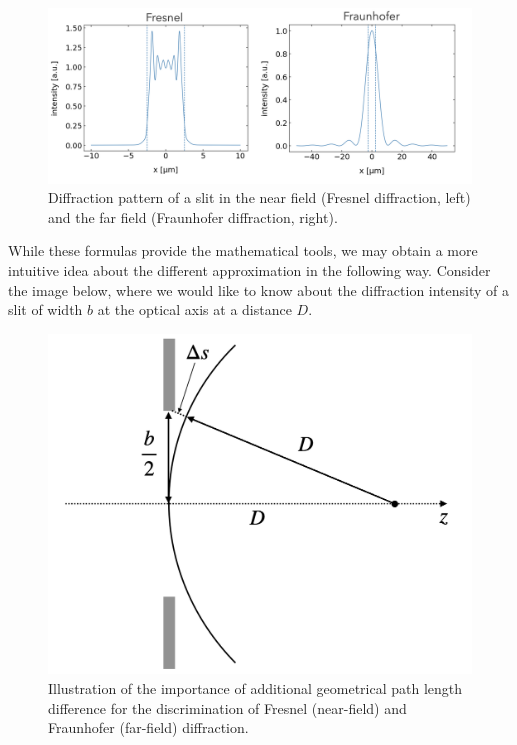 \documentclass[
  a4paper,
]{book}
\begin{document}
\begin{figure}[H]

{\centering \includegraphics[width=0.9\linewidth,height=\textheight,keepaspectratio]{wave-optics/img/near_far_field.png}

}

\caption{Diffraction pattern of a slit in the near field (Fresnel
diffraction, left) and the far field (Fraunhofer diffraction, right).}

\end{figure}%

While these formulas provide the mathematical tools, we may obtain a
more intuitive idea about the different approximation in the following
way. Consider the image below, where we would like to know about the
diffraction intensity of a slit of width \(b\) at the optical axis at a
distance \(D\).

\begin{figure}[H]

{\centering \includegraphics[width=0.55\linewidth,height=\textheight,keepaspectratio]{wave-optics/img/diffraction.png}

}

\caption{Illustration of the importance of additional geometrical path
length difference for the discrimination of Fresnel (near-field) and
Fraunhofer (far-field) diffraction.}

\end{figure}%
\end{document}
